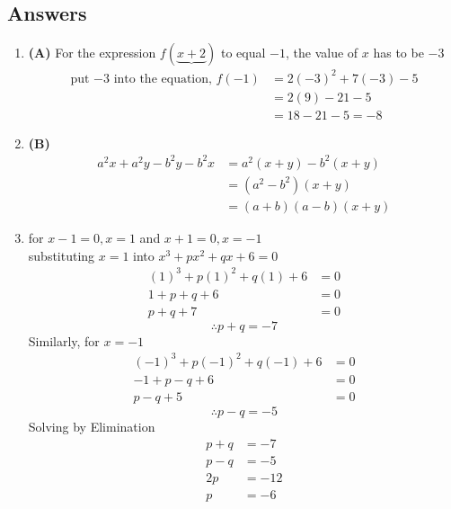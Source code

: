\subsection{Answers}
\begin{multicols}{2}
\begin{enumerate}[label={\textbf{\arabic*.}}]
\item \textbf{(A)} For the expression $f(\underbrace{x + 2})$ to equal $-1$, the value of  $x$ has to be $-3$ 
    \begin{align*}
    \text{put $-3$ into the equation, } f(-1) &= 2(-3)^2 + 7(-3) - 5 \\
     &= 2(9) - 21 - 5 \\
     &= 18 - 21 - 5 = -8
    \end{align*}
    \item \textbf{(B)} \begin{align*}  a^2x + a^2y - b^2y - b^2x &=a^2(x + y) -b^2(x + y) \\ 
        &= (a^2 - b^2)(x + y) \\ &=(a + b)(a - b) (x + y)
    \end{align*}
    \item for $x-1 = 0, x = 1 $ and $ x+1=0, x = -1$ \\
    substituting $x = 1$ into $x^3 + px^2 + qx + 6 = 0$ 
    \begin{align*}
    (1)^3 + p(1)^2 + q(1) + 6 &= 0 \\
    1+ p + q + 6 &= 0 \\
    p + q + 7 &= 0 
    \end{align*}
    \begin{equation}\tag{1}
        \therefore p + q = -7
    \end{equation}
    Similarly, for $x = -1$
    \begin{align*}
        (-1)^3 + p(-1)^2 + q(-1) + 6 &= 0 \\
        -1+ p - q + 6 &= 0 \\
        p - q + 5 &= 0 
        \end{align*}
        \begin{equation}\tag{2}
            \therefore p - q = -5
        \end{equation}
    Solving by Elimination
    \begin{align*}
        p + q &= -7 \\
        p - q &= -5 \\
        2p &= -12\\ 
        p &= -6
    \end{align*}
    


\end{enumerate}
\end{multicols}
